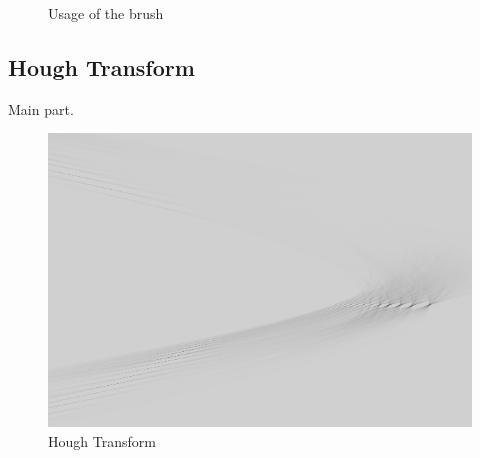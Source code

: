 \documentclass[11pt]{article}
\begin{document}
\begin{figure}[h]
		\vspace{-2mm}
		\caption{Usage of the brush}
		\label{im:brush}
	\end{figure}
	
	\subsection{Hough Transform}
	
	Main part.
	
	\begin{figure}[h]
		\centering
		\includegraphics[scale=1.2]{hough_painting.png}
		\caption{Hough Transform}
	\end{figure}
\end{document}
